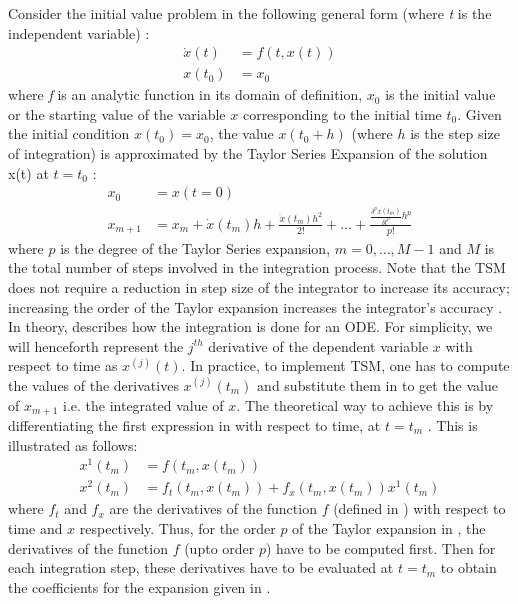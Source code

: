 Consider the initial value problem in the following general form (where \textit{t} is the independent variable) \cite{taylorSoftware}:
\begin{equation}
    \begin{aligned}
    \dot{x}(t) &= f(t,x(t)) \\
    x(t_0) &= x_0
    \end{aligned}
\label{ivp}
\end{equation}
where \textit{f} is an analytic function in its domain of definition, $x_0$ is the initial value or the starting value of the variable $x$ corresponding to the initial time $t_0$. Given the initial condition $x(t_0) = x_0$, the value $x(t_0 + h)$ (where $h$ is the step size of integration) is approximated by the Taylor Series Expansion of the solution x(t) at $t=t_0$ \cite{taylorSoftware}:
\begin{equation}
    \begin{aligned}
    x_0 &= x(t = 0) \\
    x_{m+1} &= x_m + \dot{x}(t_m)h + \frac{\ddot{x}(t_m) h^2}{2!} + \ldots + \frac{\frac{\delta^p x(t_m)}{\delta t^p} h^p}{p!}
    \end{aligned}
\label{taylorexpansion}
\end{equation}
where $p$ is the degree of the Taylor Series expansion, $m=0, \ldots,M-1$ and $M$ is the total number of steps involved in the integration process. Note that the \gls{TSM} does not require a reduction in step size of the integrator to increase its accuracy; increasing the order of the Taylor expansion increases the integrator's accuracy \cite{taylorSoftware}. In theory,  describes how the integration is done for an \gls{ODE}. For simplicity, we will henceforth represent the $j^{th}$ derivative of the dependent variable $x$ with respect to time as $x^{(j)}(t)$. In practice, to implement \gls{TSM}, one has to compute the values of the derivatives $x^{(j)} (t_m)$ and substitute them in  to get the value of $x_{m+1}$ i.e. the integrated value of $x$. The theoretical way to achieve this is by differentiating the first expression in  with respect to time, at $t=t_m$ \cite{taylorSoftware}. This is illustrated as follows:
\begin{equation}
    \begin{aligned}
    x^1 (t_m) &= f(t_m, x(t_m)) \\
    x^2 (t_m) &= f_t(t_m, x(t_m)) + f_x(t_m, x(t_m)) x^1 (t_m)
    \end{aligned}
\end{equation}
where $f_t$ and $f_x$ are the derivatives of the function $f$ (defined in ) with respect to time and $x$ respectively. Thus, for the order $p$ of the Taylor expansion in , the derivatives of the function $f$ (upto order $p$) have to be computed first. Then for each integration step, these derivatives have to be evaluated at $t=t_m$ to obtain the coefficients for the expansion given in  \cite{taylorSoftware}.

